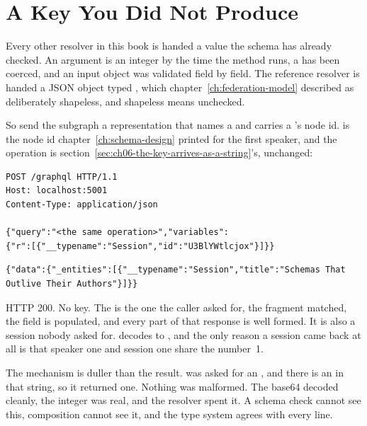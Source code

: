 \section{A Key You Did Not Produce}
\label{sec:ch06-a-key-you-did-not-produce}

%
Every other resolver in this book is handed a value the schema has already
checked. An  argument is an integer by the time the method runs, a
 has been coerced, and an input object was validated field by
field. The reference resolver is handed a JSON object typed , which
chapter~\ref{ch:federation-model} described as deliberately shapeless, and
shapeless means unchecked.

%
So send the subgraph a representation that names a  and carries a
's node id.  is the node id
chapter~\ref{ch:schema-design} printed for the first speaker, and the operation
is section~\ref{sec:ch06-the-key-arrives-as-a-string}'s, unchanged:

\begin{verbatim}
POST /graphql HTTP/1.1
Host: localhost:5001
Content-Type: application/json

{"query":"<the same operation>","variables":
{"r":[{"__typename":"Session","id":"U3BlYWtlcjox"}]}}
\end{verbatim}

\begin{verbatim}
{"data":{"_entities":[{"__typename":"Session","title":"Schemas That Outlive Their Authors"}]}}
\end{verbatim}

%
HTTP 200. No  key. The  is the one the caller
asked for, the fragment matched, the field is populated, and every part of that
response is well formed. It is also a session nobody asked for.
 decodes to , and the only reason a session
came back at all is that speaker one and session one share the number~1.

%
The mechanism is duller than the result.  was asked for an
, and there is an  in that string, so it returned one.
Nothing was malformed. The base64 decoded cleanly, the integer was real, and the
resolver spent it. A schema check cannot see this, composition cannot see it,
and the type system agrees with every line.

